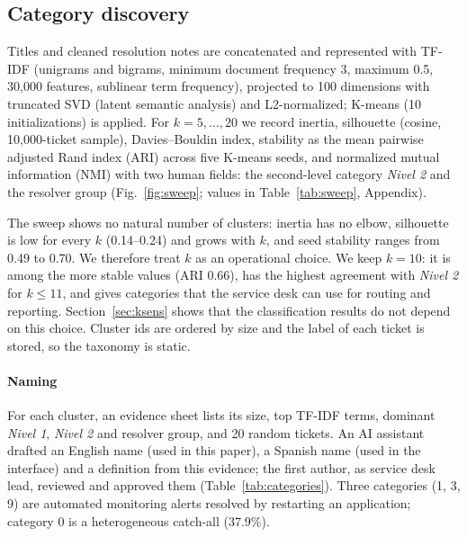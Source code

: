 \documentclass[conference]{IEEEtran}
\begin{document}
\subsection{Category discovery}\label{sec:taxonomy}
Titles and cleaned resolution notes are concatenated and represented with TF-IDF (unigrams and bigrams,
minimum document frequency 3, maximum 0.5, 30,000 features, sublinear term frequency), projected to 100
dimensions with truncated SVD (latent semantic analysis) and L2-normalized; K-means (10 initializations) is
applied. For $k=5,\dots,20$ we record inertia, silhouette (cosine, 10,000-ticket sample), Davies--Bouldin
index, stability as the mean pairwise adjusted Rand index (ARI) across five K-means seeds, and normalized
mutual information (NMI) with two human fields: the second-level category \emph{Nivel 2} and the resolver
group (Fig.~\ref{fig:sweep}; values in Table~\ref{tab:sweep}, Appendix).

The sweep shows no natural number of clusters: inertia has no elbow, silhouette is low for every $k$
(0.14--0.24) and grows with $k$, and seed stability ranges from 0.49 to 0.70. We therefore treat $k$ as an
operational choice. We keep $k=10$: it is among the more stable values (ARI 0.66), has the highest agreement
with \emph{Nivel 2} for $k\le 11$, and gives categories that the service desk can use for routing and
reporting. Section~\ref{sec:ksens} shows that the classification results do not depend on this choice. Cluster
ids are ordered by size and the label of each ticket is stored, so the taxonomy is static.

\paragraph{Naming} For each cluster, an evidence sheet lists its size, top TF-IDF terms, dominant
\emph{Nivel 1}, \emph{Nivel 2} and resolver group, and 20 random tickets. An AI assistant drafted an English
name (used in this paper), a Spanish name (used in the interface) and a definition from this evidence; the
first author, as service desk lead, reviewed and approved them (Table~\ref{tab:categories}). Three categories (1, 3,
9) are automated monitoring alerts resolved by restarting an application; category 0 is a heterogeneous
catch-all (37.9\%).
\end{document}
